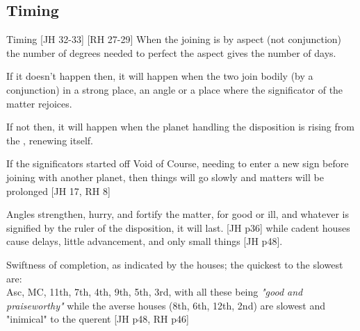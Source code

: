 \subsection{Timing}
\begin{frame}[t]{Timing  [JH 32-33] [RH 27-29]}
When the joining is by aspect (not conjunction) the number of degrees needed to perfect the aspect gives the number of days.

If it doesn't happen then, it will happen when the two join bodily (by a conjunction) in a strong place, an angle or a place where the significator of the matter rejoices.

If not then, it will happen when the planet handling the disposition is rising from the \Sun, renewing itself.

If the significators started off Void of Course, needing to enter a new sign before joining with  another planet, then things will go slowly and matters will be prolonged [JH 17, RH 8]

Angles strengthen, hurry, and fortify the matter, for good or ill, and whatever is signified by the ruler of the disposition, it will last. [JH p36] while cadent houses cause delays, little advancement, and only small things [JH p48].

Swiftness of completion, as indicated by the houses; the quickest to the slowest are: \\
Asc, MC, 11th, 7th, 4th, 9th, 5th, 3rd,  with all these being \textsl{"good and praiseworthy"} while the averse houses (8th, 6th, 12th, 2nd) are slowest and "inimical" to the querent [JH p48, RH p46]

\end{frame}